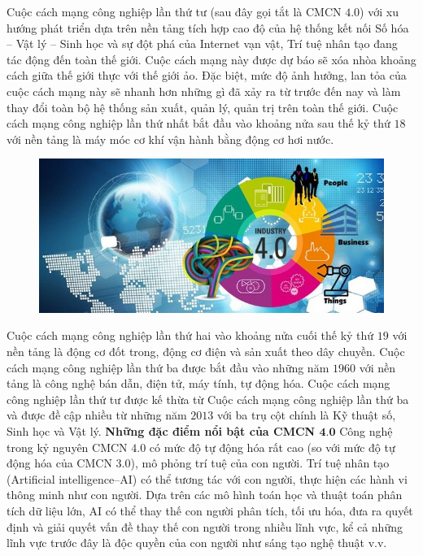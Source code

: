 \vspace*{188pt}
\begin{multicols}{2}
	Cuộc cách mạng công nghiệp lần thứ tư (sau đây gọi tắt là CMCN $4{.}0$) với xu hướng phát triển dựa trên nền tảng tích hợp cao độ của hệ thống kết nối Số hóa -- Vật lý -- Sinh học và sự đột phá của Internet vạn vật, Trí tuệ nhân tạo đang tác động đến toàn thế giới. Cuộc cách mạng này được dự báo sẽ xóa nhòa khoảng cách giữa thế giới thực với thế giới ảo. Đặc biệt, mức độ ảnh hưởng, lan tỏa của cuộc cách mạng này sẽ nhanh hơn những gì đã xảy ra từ trước đến nay và làm thay đổi toàn bộ hệ thống sản xuất, quản lý, quản trị trên toàn thế giới. Cuộc cách mạng công nghiệp lần thứ nhất bắt đầu vào khoảng nửa sau thế kỷ thứ $18$ với nền tảng là máy móc cơ khí vận hành bằng động cơ hơi nước.
	\begin{figure}[H]
		\vspace*{-5pt}
		\centering
		\captionsetup{labelformat= empty, justification=centering}
		\includegraphics[width= 1\linewidth]{1a}
		\vspace*{-15pt}
	\end{figure}
	Cuộc cách mạng công nghiệp lần thứ hai vào khoảng nửa cuối thế kỷ thứ $19$ với nền tảng là động cơ đốt trong, động cơ điện và sản xuất theo dây chuyền. Cuộc cách mạng công nghiệp lần thứ ba được bắt đầu vào những năm $1960$ với nền tảng là công nghệ bán dẫn, điện tử, máy tính, tự động hóa. Cuộc cách mạng công nghiệp lần thứ tư được kế thừa từ Cuộc  cách mạng công nghiệp lần thứ ba và được đề cập nhiều từ những năm $2013$ với ba trụ cột chính là Kỹ thuật số, Sinh học và Vật lý.
	\vskip 0.05cm
	\textbf{\color{toanhocdoisong}Những đặc điểm nổi bật của CMCN $\pmb{4{.}0}$}
	\vskip 0.05cm
	Công nghệ trong kỷ nguyên CMCN $4{.}0$ có mức độ tự động hóa rất cao (so với mức độ tự động hóa của CMCN $3.0$), mô phỏng trí tuệ của con người. Trí tuệ nhân tạo (Artificial intelligence--AI) có thể tương tác với con người, thực hiện các hành vi thông minh như con người. Dựa trên các mô hình toán học và thuật toán phân tích dữ liệu lớn, AI có thể thay thế con người phân tích, tối ưu hóa, đưa ra quyết định và giải quyết vấn đề thay thế con người trong nhiều lĩnh vực, kể cả những lĩnh vực trước đây là độc quyền của con người như sáng tạo nghệ thuật v.v. 

\end{multicols}
